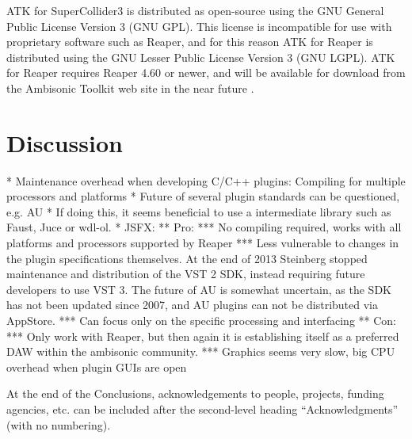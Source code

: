 \documentclass{article}
\begin{document}
ATK for SuperCollider3 is distributed as open-source using the GNU General Public License Version 3 (GNU GPL). This license is incompatible for use with proprietary software such as Reaper, and for this reason ATK for Reaper is distributed using the GNU Lesser Public License Version 3 (GNU LGPL).
ATK for Reaper requires Reaper 4.60 or newer, and will be available for download from the Ambisonic Toolkit web site in the near future \cite{ambisonictoolkit.net:2014}.



\section{Discussion}

* Maintenance overhead when developing C/C++ plugins: Compiling for multiple processors and platforms
* Future of several plugin standards can be questioned, e.g. AU
* If doing this, it seems beneficial to use a intermediate library such as Faust, Juce or wdl-ol.
* JSFX: 
** Pro:
*** No compiling required, works with all platforms and processors supported by Reaper
*** Less vulnerable to changes in the plugin specifications themselves. At the end of 2013 Steinberg stopped maintenance and distribution of the VST 2 SDK, instead requiring future developers to use VST 3. The future of AU is somewhat uncertain, as the SDK has not been updated since 2007, and AU plugins can not be distributed via AppStore.
*** Can focus only on the specific processing and interfacing 
** Con:
*** Only work with Reaper, but then again it is establishing itself as a preferred DAW within the ambisonic community.
*** Graphics seems very slow, big CPU overhead when plugin GUIs are open




\begin{acknowledgments}
At the end of the Conclusions, acknowledgements to people, projects, funding agencies, etc. can be included after the second-level heading ``Acknowledgments'' (with no numbering).
\end{acknowledgments} 


\end{document}
